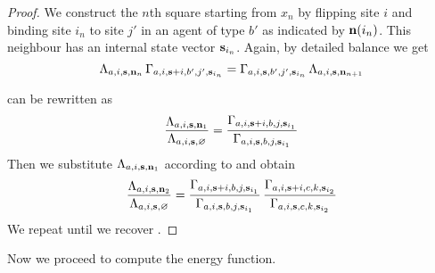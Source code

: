 \begin{proof}
  We construct the $n$th square
  starting from $x_n$ by flipping site $i$
  and binding site $i_n$ to site $j'$ in an agent of type $b'$
  as indicated by $\boldsymbol{\mathbf{n}}(i_n)$.
  This neighbour has an internal state vector $\boldsymbol{\mathbf{s}}_{i_n}$.
  Again, by detailed balance we get
  \begin{equation}
    \label{eq:fbn}
    \Lambda_{a,i,\boldsymbol{\mathbf{s}},\boldsymbol{\mathbf{n}}_n} \,
    \Gamma_{a,i,\boldsymbol{\mathbf{s}}+i,b',j',\boldsymbol{\mathbf{s}}_{i_n}} =
    \Gamma_{a,i,\boldsymbol{\mathbf{s}},b',j',\boldsymbol{\mathbf{s}}_{i_n}} \,
    \Lambda_{a,i,\boldsymbol{\mathbf{s}},\boldsymbol{\mathbf{n}}_{n+1}}
  \end{equation}

   can be rewritten as
  \begin{equation*}
    \frac{
      \Lambda_{a,i,\boldsymbol{\mathbf{s}},\boldsymbol{\mathbf{n}}_1}}{
      \Lambda_{a,i,\boldsymbol{\mathbf{s}},\varnothing}} =
    \frac{
      \Gamma_{a,i,\boldsymbol{\mathbf{s}}+i,
              b,j,\boldsymbol{\mathbf{s}}_{i_1}}}{
      \Gamma_{a,i,\boldsymbol{\mathbf{s}},
              b,j,\boldsymbol{\mathbf{s}}_{i_1}}}
  \end{equation*}
  Then we substitute $\Lambda_{a,i,\boldsymbol{\mathbf{s}},\boldsymbol{\mathbf{n}}_1}$
  according to  and obtain
  \begin{equation*}
    \frac{
      \Lambda_{a,i,\boldsymbol{\mathbf{s}},\boldsymbol{\mathbf{n}}_2}}{
      \Lambda_{a,i,\boldsymbol{\mathbf{s}},\varnothing}} =
    \frac{
      \Gamma_{a,i,\boldsymbol{\mathbf{s}}+i,
              b,j,\boldsymbol{\mathbf{s}}_{i_1}}}{
      \Gamma_{a,i,\boldsymbol{\mathbf{s}},
              b,j,\boldsymbol{\mathbf{s}}_{i_1}}} \,
    \frac{
      \Gamma_{a,i,\boldsymbol{\mathbf{s}}+i,
              c,k,\boldsymbol{\mathbf{s}}_{i_2}}}{
      \Gamma_{a,i,\boldsymbol{\mathbf{s}},
              c,k,\boldsymbol{\mathbf{s}}_{i_2}}}
  \end{equation*}
  We repeat until we recover .
\end{proof}

Now we proceed to compute the energy function.

